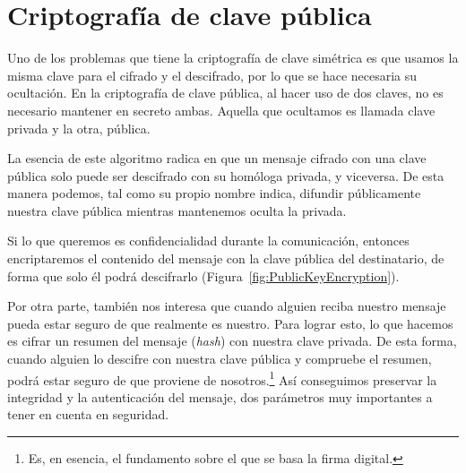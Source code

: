\section{Criptografía de clave pública}

Uno de los problemas que tiene la criptografía de clave simétrica es que usamos la misma clave para el cifrado y el descifrado, por lo que se hace necesaria su ocultación. En la criptografía de clave pública, al hacer uso de dos claves, no es necesario mantener en secreto ambas. Aquella que ocultamos es llamada clave privada y la otra, pública.

La esencia de este algoritmo radica en que un mensaje cifrado con una clave pública solo puede ser descifrado con su homóloga privada, y viceversa. De esta manera podemos, tal como su propio nombre indica, difundir públicamente nuestra clave pública mientras mantenemos oculta la privada.

Si lo que queremos es confidencialidad durante la comunicación, entonces encriptaremos el contenido del mensaje con la clave pública del destinatario, de forma que solo él podrá descifrarlo (Figura~\ref{fig:PublicKeyEncryption}).

Por otra parte, también nos interesa que cuando alguien reciba nuestro mensaje pueda estar seguro de que realmente es nuestro. Para lograr esto, lo que hacemos es cifrar un resumen del mensaje (\emph{hash}) con nuestra clave privada. De esta forma, cuando alguien lo descifre con nuestra clave pública y compruebe el resumen, podrá estar seguro de que proviene de nosotros.\footnote{Es, en esencia, el fundamento sobre el que se basa la firma digital.} Así conseguimos preservar la integridad y la autenticación del mensaje, dos parámetros muy importantes a tener en cuenta en seguridad. \emph{\parencite{Reference14}}

